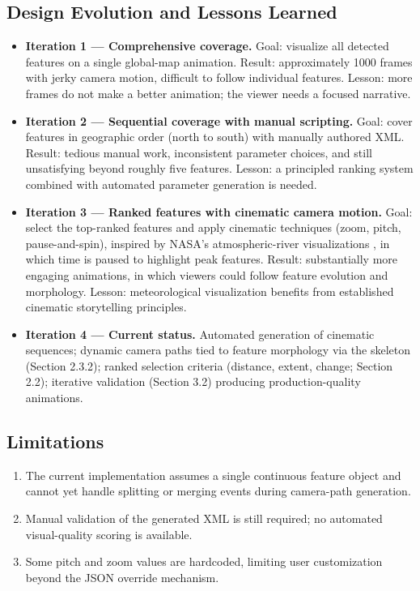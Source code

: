\documentclass[journal abbreviation, manuscript]{copernicus}
\begin{document}
\subsection{Design Evolution and Lessons Learned}
\begin{itemize}
\item \textbf{Iteration 1 --- Comprehensive coverage.} Goal: visualize all detected features on a single global-map animation. Result: approximately 1000 frames with jerky camera motion, difficult to follow individual features. Lesson: more frames do not make a better animation; the viewer needs a focused narrative.
\item \textbf{Iteration 2 --- Sequential coverage with manual scripting.} Goal: cover features in geographic order (north to south) with manually authored XML. Result: tedious manual work, inconsistent parameter choices, and still unsatisfying beyond roughly five features. Lesson: a principled ranking system combined with automated parameter generation is needed.
\item \textbf{Iteration 3 --- Ranked features with cinematic camera motion.} Goal: select the top-ranked features and apply cinematic techniques (zoom, pitch, pause-and-spin), inspired by NASA's atmospheric-river visualizations \citep{nasa-climate}, in which time is paused to highlight peak features. Result: substantially more engaging animations, in which viewers could follow feature evolution and morphology. Lesson: meteorological visualization benefits from established cinematic storytelling principles.
\item \textbf{Iteration 4 --- Current status.} Automated generation of cinematic sequences; dynamic camera paths tied to feature morphology via the skeleton (Section 2.3.2); ranked selection criteria (distance, extent, change; Section 2.2); iterative validation (Section 3.2) producing production-quality animations.
\end{itemize}

\subsection{Limitations}
\begin{enumerate}
\item The current implementation assumes a single continuous feature object and cannot yet handle splitting or merging events during camera-path generation.
\item Manual validation of the generated XML is still required; no automated visual-quality scoring is available.
\item Some pitch and zoom values are hardcoded, limiting user customization beyond the JSON override mechanism.
\end{enumerate}
\end{document}
